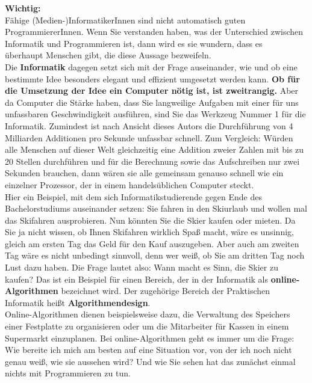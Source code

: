 \textbf{Wichtig:}\\
Fähige (Medien-)InformatikerInnen sind nicht automatisch guten ProgrammiererInnen. Wenn Sie verstanden haben, was der Unterschied zwischen Informatik und Programmieren ist, dann wird es sie wundern, dass es\\
überhaupt Menschen gibt, die diese Aussage bezweifeln.\\

Die \textbf{Informatik} dagegen setzt sich mit der Frage auseinander, wie und ob eine bestimmte Idee besonders elegant und effizient umgesetzt werden kann. \textbf{Ob für die Umsetzung der Idee ein Computer nötig ist, ist zweitrangig.} Aber da Computer die Stärke haben, dass Sie langweilige Aufgaben mit einer für uns unfassbaren Geschwindigkeit ausführen, sind Sie das Werkzeug Nummer 1 für die Informatik. Zumindest ist nach Ansicht dieses Autors die Durchführung von 4 Milliarden Additionen pro Sekunde unfassbar schnell. Zum Vergleich: Würden alle Menschen auf dieser Welt gleichzeitig eine Addition zweier Zahlen mit bis zu 20 Stellen durchführen und für die Berechnung sowie das Aufschreiben nur zwei Sekunden brauchen, dann wären sie alle gemeinsam genauso schnell wie ein einzelner Prozessor, der in einem handelsüblichen Computer steckt.\\

Hier ein Beispiel, mit dem sich Informatikstudierende gegen Ende des Bachelorstudiums auseinander setzen: Sie fahren in den Skiurlaub und wollen mal das Skifahren ausprobieren. Nun könnten Sie die Skier kaufen oder mieten. Da Sie ja nicht wissen, ob Ihnen Skifahren wirklich Spaß macht, wäre es unsinnig, gleich am ersten Tag das Geld für den Kauf auszugeben. Aber auch am zweiten Tag wäre es nicht unbedingt sinnvoll, denn wer weiß, ob Sie am dritten Tag noch Lust dazu haben. Die Frage lautet also: Wann macht es Sinn, die Skier zu kaufen? Das ist ein Beispiel für einen Bereich, der in der Informatik als \textbf{online-Algorithmen} bezeichnet wird. Der zugehörige Bereich der Praktischen Informatik heißt \textbf{Algorithmendesign}.\\

Online-Algorithmen dienen beispielsweise dazu, die Verwaltung des Speichers einer Festplatte zu organisieren oder um die Mitarbeiter für Kassen in einem Supermarkt einzuplanen. Bei online-Algorithmen geht es immer um die Frage: Wie bereite ich mich am besten auf eine Situation vor, von der ich noch nicht genau weiß, wie sie aussehen wird? Und wie Sie sehen hat das zunächst einmal nichts mit Programmieren zu tun.\\

